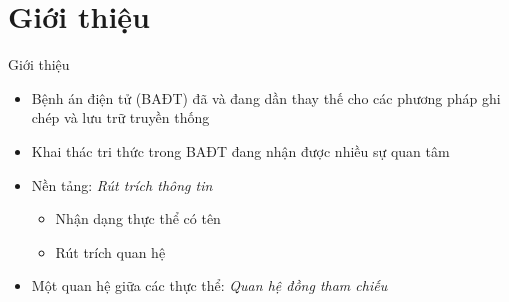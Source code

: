 \section{Giới thiệu}
\begin{frame}{Giới thiệu}
\putlogo
\begin{itemize}
	\item Bệnh án điện tử (BAĐT) đã và đang dần thay thế cho các phương pháp ghi chép và lưu trữ truyền
	thống
	\item Khai thác tri thức trong BAĐT đang nhận được nhiều sự quan tâm
	\item Nền tảng: \emph{Rút trích thông tin}
	\begin{itemize}
		\item Nhận dạng thực thể có tên
		\item Rút trích quan hệ
	\end{itemize}
	\item Một quan hệ giữa các thực thể: \emph{Quan hệ đồng tham chiếu}
\end{itemize}
\end{frame}
